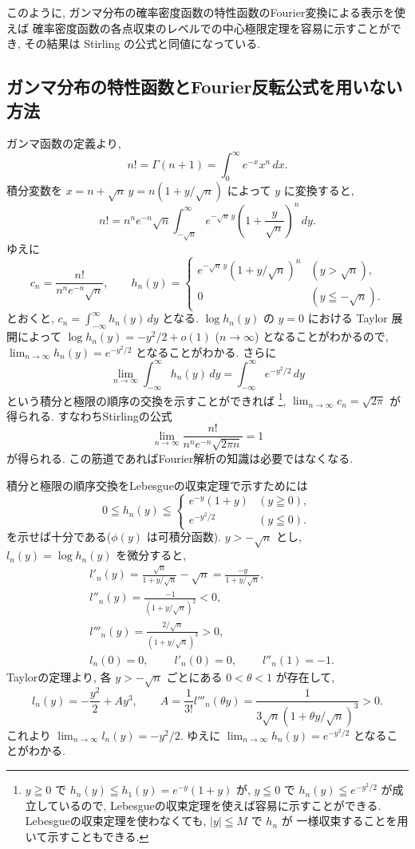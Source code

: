 \documentclass[12pt,twoside]{jarticle}
\theoremstyle{jplain}
\theoremstyle{jplain}
\theoremstyle{jplain}
\numberwithin{theorem}{section}
\numberwithin{equation}{section}
\numberwithin{figure}{section}
\numberwithin{table}{section}
\begin{document}
このように, 
ガンマ分布の確率密度函数の特性函数のFourier変換による表示を使えば
確率密度函数の各点収束のレベルでの中心極限定理を容易に示すことができ,
その結果は Stirling の公式と同値になっている.


\subsection{ガンマ分布の特性函数とFourier反転公式を用いない方法}
\label{sec:pconv-2}

ガンマ函数の定義より,
\[
n! = \Gamma(n+1)=\int_0^\infty e^{-x} x^n\,dx.
\]
積分変数を $x=n+\sqrt{n}\,y=n(1+y/\sqrt{n})$ によって $y$ に変換すると, 
\[
n! = n^n e^{-n}\sqrt{n} \int_{-\sqrt{n}}^\infty e^{-\sqrt{n}\,y}\left(1+\frac{y}{\sqrt{n}}\right)^n\,dy. 
\]
ゆえに
\[
c_n = \frac{n!}{n^n e^{-n}\sqrt{n}}, 
\qquad
h_n(y) = 
\begin{cases}
e^{-\sqrt{n}\,y}(1+y/\sqrt{n})^n & (y>\sqrt{n}), \\
0 & (y\leqq -\sqrt{n}).
\end{cases}
\]
とおくと, $c_n=\int_{-\infty}^\infty h_n(y)\,dy$ となる.
$\log h_n(y)$ の $y=0$ における Taylor 展開によって
$\log h_n(y) = -y^2/2 + o(1)$ ($n\to\infty$)
となることがわかるので,  $\lim_{n\to\infty} h_n(y)=e^{-y^2/2}$ となることがわかる.
さらに
\[
  \lim_{n\to\infty}\int_{-\infty}^\infty h_n(y)\,dy
 =\int_{-\infty}^\infty e^{-y^2/2}\,dy
\]
という積分と極限の順序の交換を示すことができれば%
\footnote{$y\geqq 0$ で $h_n(y)\leqq h_1(y)=e^{-y}(1+y)$ が, 
$y\leqq 0$ で $h_n(y)\leqq e^{-y^2/2}$ が成立しているので, 
Lebesgueの収束定理を使えば容易に示すことができる.
Lebesgueの収束定理を使わなくても, $|y|\leqq M$ で $h_n$ が
一様収束することを用いて示すこともできる.}, 
$\lim_{n\to\infty}c_n=\sqrt{2\pi}$ が得られる. すなわちStirlingの公式
\[
\lim_{n\to\infty} \frac{n!}{n^n e^{-n} \sqrt{2\pi n}}=1
\]
が得られる.  この筋道であればFourier解析の知識は必要ではなくなる.

積分と極限の順序交換をLebesgueの収束定理で示すためには
\[
0\leqq h_n(y)\leqq
\begin{cases}
e^{-y}(1+y) & (y\geqq 0), \\
e^{-y^2/2}  & (y\leqq 0).
\end{cases}
\]
を示せば十分である($\phi(y)$ は可積分函数). 
$y>-\sqrt{n}$ とし, $l_n(y)=\log h_n(y)$ を微分すると,
\begin{align*}
&
l'_n(y)
=\frac{\sqrt{n}}{1+y/\sqrt{n}}-\sqrt{n}
=\frac{-y}{1+y/\sqrt{n}},
\\ &
l''_n(y)=\frac{-1}{(1+y/\sqrt{n})^2}<0,
\\ &
l'''_n(y)=\frac{2/\sqrt{n}}{(1+y/\sqrt{n})^3}>0,
\\ &
l_n(0)=0, \qquad\;
l'_n(0)=0, \qquad\;
l''_n(1)=-1.
\end{align*}
Taylorの定理より, 各 $y>-\sqrt{n}$ ごとにある $0<\theta<1$ が存在して, 
\[
l_n(y) = -\frac{y^2}{2} + Ay^3, \qquad
A = \frac{1}{3!}l'''_n(\theta y) =
\frac{1}{3\sqrt{n}(1+\theta y/\sqrt{n})^3} > 0.
\]
これより $\lim_{n\to\infty}l_n(y)=-y^2/2$. 
ゆえに $\lim_{n\to\infty}h_n(y)=e^{-y^2/2}$ となることがわかる.
\end{document}
